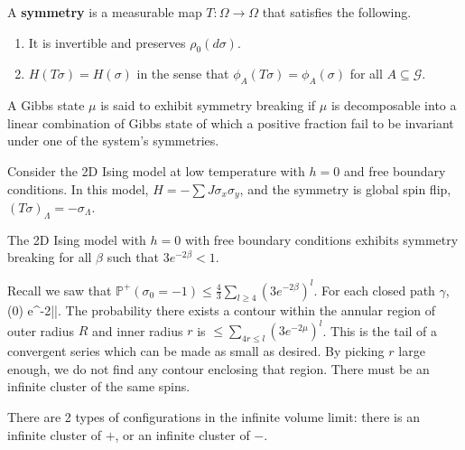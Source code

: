 \documentclass[12pt]{book}
\theoremstyle{norm}
\begin{document}
\begin{definition}
A \textbf{symmetry} is a measurable map $T:\Omega\to \Omega$ that satisfies the following.
\begin{enumerate}
\item
It is invertible and preserves $\rho_0(d\sigma)$.
\item
$H(T\sigma) = H(\sigma)$ in the sense that $\phi_A(T\sigma) = \phi_A(\sigma)$ for all $A\subseteq \mathcal{G}$.
\end{enumerate}
\end{definition}

\begin{definition}
A Gibbs state $\mu$ is said to exhibit symmetry breaking if $\mu$ is decomposable into a linear combination of Gibbs state of which a positive fraction fail to be invariant under one of the system's symmetries.
\end{definition}

Consider the 2D Ising model at low temperature with $h=0$ and free boundary conditions. In this model, $H=-\sum J\sigma_x\sigma_y$, and the symmetry is global spin flip, $(T\sigma)_\Lambda = -\sigma_\Lambda$.

\begin{theorem}
The 2D Ising model with $h=0$ with free boundary conditions exhibits symmetry breaking for all $\beta$ such that $3e^{-2\beta}<1$.
\end{theorem}

Recall we saw that $\mathbb{P}^+(\sigma_0=-1) \le \frac{4}{3} \sum_{l\ge 4}(3e^{-2\beta})^l$.
For each closed path $\gamma$,
\be
{}(\gamma {}0) \le e^{-2\beta|\gamma|}.
\ee
The probability there exists a contour within the annular region of outer radius $R$ and inner radius $r$ is $\le \sum_{4r\le l}(3e^{-2\mu})^l$. This is the tail of a convergent series which can be made as small as desired. By picking $r$ large enough, we do not find any contour enclosing that region.
There must be an infinite cluster of the same spins.

There are 2 types of configurations in the infinite volume limit: there is an infinite cluster of $+$, or an infinite cluster of $-$.
\end{document}
